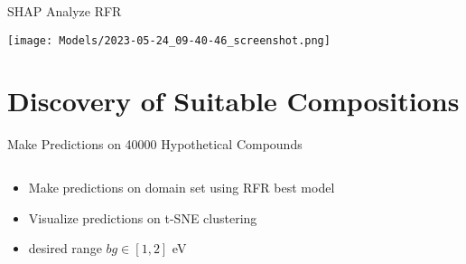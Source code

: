\documentclass[10pt, aspectratio=169, presentation]{beamer}
\begin{document}
\begin{frame}[label={sec:orgf5bb645}]{SHAP Analyze RFR}
\begin{center}
\texttt{[image: Models/2023-05-24\_09-40-46\_screenshot.png]}
\end{center}
\end{frame}

\section{Discovery of Suitable Compositions}
\label{sec:org9bc2a69}
\begin{frame}[label={sec:org9d6f221}]{Make Predictions on \alert{40000} Hypothetical Compounds}
\begin{columns}
\begin{column}{0.4\columnwidth}
\begin{itemize}
\item Make predictions on domain set using RFR best model
\item Visualize predictions on t-SNE clustering
\item desired range \(bg \in [1, 2]\) eV
\end{itemize}
\end{column}

\begin{column}{0.6\columnwidth}
 
\begin{center}

\end{center}
\end{column}
\end{columns}
\end{frame}
\end{document}
